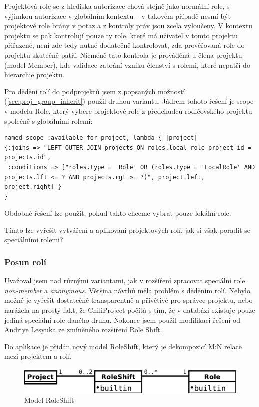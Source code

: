 \documentclass[thesis=B,czech]{FITthesis}[2012/05/02]
\begin{document}
Projektová role se z hlediska autorizace chová stejně jako normální
role, s výjimkou autorizace v globálním kontextu -- v takovém případě
nesmí být projektové role brány v potaz a z kontroly práv jsou zcela
vyloučeny. V kontextu projektu se pak kontrolují pouze ty role, které má
uživatel v tomto projektu přiřazené, není zde tedy nutné dodatečně
kontrolovat, zda prověřovaná role do projektu skutečně patří. Nicméně
tato kontrola je prováděná u člena projektu (model Member), kde validace
zabrání vzniku členství s rolemi, které nepatří do hierarchie projektu.

Pro dědění rolí do podprojektů jsem z popsaných možností
(\ref{sec:proj_group_inherit}) použil druhou variantu. Jádrem tohoto
řešení je \gls{scope} v modelu Role, který vybere projektové role
z předchůdců rodičovského projektu společně s globálními rolemi:

\begin{lstlisting}
named_scope :available_for_project, lambda { |project|
{:joins => "LEFT OUTER JOIN projects ON roles.local_role_project_id = projects.id",
 :conditions => ["roles.type = 'Role' OR (roles.type = 'LocalRole' AND projects.lft <= ? AND projects.rgt >= ?)", project.left, project.right] }
}
\end{lstlisting}
Obdobné řešení lze použít, pokud takto chceme vybrat pouze lokální role.

Tímto lze vyřešit vytváření a aplikování projektových rolí, jak si však
poradit se speciálními rolemi?

\subsubsection{Posun rolí}

Uvažoval jsem nad různými variantami, jak v rozšíření zpracovat speciální
role \emph{non-member} a \emph{anonymous}. Většina návrhů měla problém
s děděním rolí. Nebylo možné je vyřešit dostatečně transparentně a
přívětivě pro správce projektu, nebo narážela na prostý fakt, že
ChiliProject počítá s tím, že v databázi existuje pouze jediná speciální
role daného druhu. Nakonec jsem použil modifikaci řešení od Andriye
Lesyuka ze zmíněného rozšíření Role Shift.

Do aplikace je přidán nový model RoleShift, který je dekompozicí M:N
relace mezi projektem a rolí.

\begin{figure}[htbp]
\centering
\includegraphics[width=1\textwidth]{role-er2.pdf}
\caption{Model RoleShift}
\end{figure}
\end{document}
